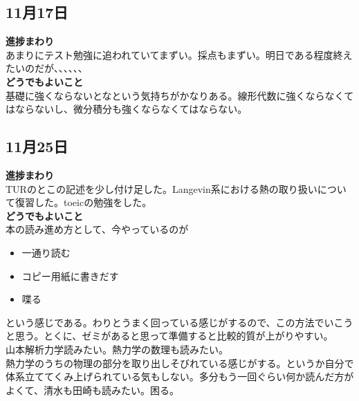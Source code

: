 \documentclass[a4paper,11pt]{jsarticle}
\numberwithin{equation}{section}
\begin{document}
\subsection*{11月17日}
\textbf{進捗まわり} \\
あまりにテスト勉強に追われていてまずい。採点もまずい。明日である程度終えたいのだが、、、、、、\\
\textbf{どうでもよいこと} \\
基礎に強くならないとなという気持ちがかなりある。線形代数に強くならなくてはならないし、微分積分も強くならなくてはならない。\\

\subsection*{11月25日}
\textbf{進捗まわり} \\
TURのとこの記述を少し付け足した。Langevin系における熱の取り扱いについて復習した。toeicの勉強をした。\\
\textbf{どうでもよいこと} \\
本の読み進め方として、今やっているのが
\begin{itemize}
  \item 一通り読む
  \item コピー用紙に書きだす
  \item 喋る
\end{itemize}
という感じである。わりとうまく回っている感じがするので、この方法でいこうと思う。とくに、ゼミがあると思って準備すると比較的質が上がりやすい。\\
山本解析力学読みたい。熱力学の数理も読みたい。\\
熱力学のうちの物理の部分を取り出しそびれている感じがする。というか自分で体系立ててくみ上げられている気もしない。多分もう一回ぐらい何か読んだ方がよくて、清水も田崎も読みたい。困る。\\
\end{document}
